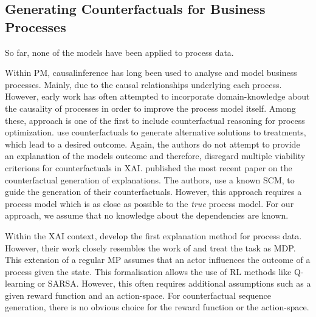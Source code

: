 \documentclass[./../../paper.tex]{subfiles}
\begin{document}
\subsection{Generating Counterfactuals for Business Processes}
So far, none of the models have been applied to process data.

Within \gls{PM}, \gls{causalinference} has long been used to analyse and model business processes. Mainly, due to the causal relationships underlying each process. However, early work has often attempted to incorporate domain-knowledge about the causality of processes in order to improve the process model itself\autocites{shook_assessmentusestructural_2004,baker_ClosingLoopEmpirical_2017,hompes_DiscoveringCausalFactors_2017,wang_CounterfactualDataAugmentedSequential_2021}.
Among these, \citeauthor{narendra_CounterfactualReasoningProcess_2019} approach is one of the first to include counterfactual reasoning for process optimization\autocite{narendra_CounterfactualReasoningProcess_2019}.
\citeauthor{oberst_CounterfactualOffPolicyEvaluation_2019} use counterfactuals to generate alternative solutions to treatments, which lead to a desired outcome\autocite{oberst_CounterfactualOffPolicyEvaluation_2019}.
Again, the authors do not attempt to provide an explanation of the models outcome and therefore, disregard multiple viability criterions for counterfactuals in \gls{XAI}. \citeauthor{qafari_CaseLevelCounterfactual_2021} published the most recent paper on the counterfactual generation of explanations\autocite{qafari_CaseLevelCounterfactual_2021}. The authors, use a known \gls{SCM}, to guide the generation of their counterfactuals. However, this approach requires a process model which is as close as possible to the \emph{true} process model. For our approach, we assume that no knowledge about the dependencies are known.

Within the \gls{XAI} context, \citeauthor{tsirtsis_CounterfactualExplanationsSequential_2021} develop the first explanation method for process data\autocite{tsirtsis_CounterfactualExplanationsSequential_2021}. However, their work closely resembles the work of \citeauthor{oberst_CounterfactualOffPolicyEvaluation_2019} and treat the task as \gls{MDP}\autocite{oberst_CounterfactualOffPolicyEvaluation_2019}. This extension of a regular \gls{MP} assumes that an actor influences the outcome of a process given the state. This formalisation allows the use of \gls{RL} methods like Q-learning or SARSA. However, this often requires additional assumptions such as a given reward function and an action-space. For counterfactual sequence generation, there is no obvious choice for the reward function or the action-space. 
\end{document}
